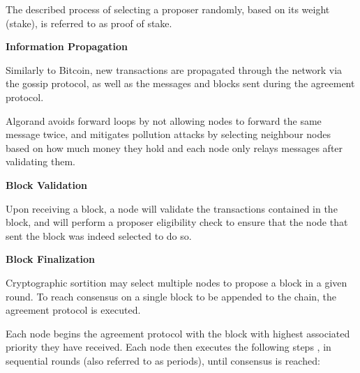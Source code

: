 The described process of selecting a proposer randomly, based on its weight (stake), is referred to as proof of stake.


\vspace{0.25cm}


\textbf{Information Propagation}

Similarly to Bitcoin, new transactions are propagated through the network via the gossip protocol, as well as the messages and blocks sent during the agreement protocol.

Algorand avoids forward loops by not allowing nodes to forward the same message twice, and mitigates pollution attacks by selecting neighbour nodes based on how much money they hold and each node only relays messages after validating them.


\vspace{0.25cm}

\textbf{Block Validation}

Upon receiving a block, a node will validate the transactions contained in the block, and will perform a proposer eligibility check to ensure that the node that sent the block was indeed selected to do so.

\vspace{0.25cm}

\textbf{Block Finalization}

Cryptographic sortition may select multiple nodes to propose a block in a given round. To reach consensus on a single block to be appended to the chain, the agreement protocol is executed.

Each node begins the agreement protocol with the block with highest associated priority they have received. Each node then executes the following steps \cite{algorand_agreement}, in sequential rounds (also referred to as periods), until consensus is reached:


